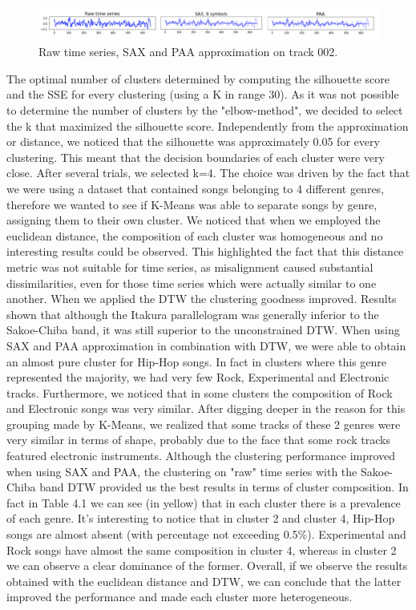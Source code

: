 \begin{figure}[!htb]
  \centering
  \includegraphics[width=1\linewidth]{images/example_SAX-PAA-RAW.png}
  \caption{Raw time series, SAX and PAA approximation on track 002.}
\end{figure}

The optimal number of clusters determined by computing the silhouette score and the SSE for every clustering (using a K in range 30). As it was not possible to determine the number of clusters by the "elbow-method", we decided to select the k that maximized the silhouette score. Independently from the approximation or distance, we noticed that the silhouette was approximately 0.05 for every clustering. This meant that the decision boundaries of each cluster were very close. After several trials, we selected k=4. The choice was driven by the fact that we were using a dataset that contained songs belonging to 4 different genres, therefore we wanted to see if K-Means was able to separate songs by genre, assigning them to their own cluster. 
We noticed that when we employed the euclidean distance, the composition of each cluster was homogeneous and no interesting results could be observed. This highlighted the fact that this distance metric was not suitable for time series, as misalignment caused substantial dissimilarities, even for those time series which were actually similar to one another. 
When we applied the DTW the clustering goodness improved. Results shown that although the Itakura parallelogram was generally inferior to the Sakoe-Chiba band, it was still superior to the unconstrained DTW. 
When using SAX and PAA approximation in combination with DTW, we were able to obtain an almost pure cluster for Hip-Hop songs. In fact in clusters where this genre represented the majority, we had very few Rock, Experimental and Electronic tracks. Furthermore, we noticed that in some clusters the composition of Rock and Electronic songs was very similar. After digging deeper in the reason for this grouping made by K-Means, we realized that some tracks of these 2 genres were very similar in terms of shape, probably due to the face that some rock tracks featured electronic instruments. 
Although the clustering performance improved when using SAX and PAA, the clustering on "raw" time series with the Sakoe-Chiba band DTW provided us the best results in terms of cluster composition.
In fact in Table 4.1 we can see (in yellow) that in each cluster there is a prevalence of each genre. It's interesting to notice that in cluster 2 and cluster 4, Hip-Hop songs are almost absent (with percentage not exceeding 0.5\%). Experimental and Rock songs have almost the same composition in cluster 4, whereas in cluster 2 we can observe a clear dominance of the former. Overall, if we observe the results obtained with the euclidean distance and DTW, we can conclude that the latter improved the performance and made each cluster more heterogeneous. 

